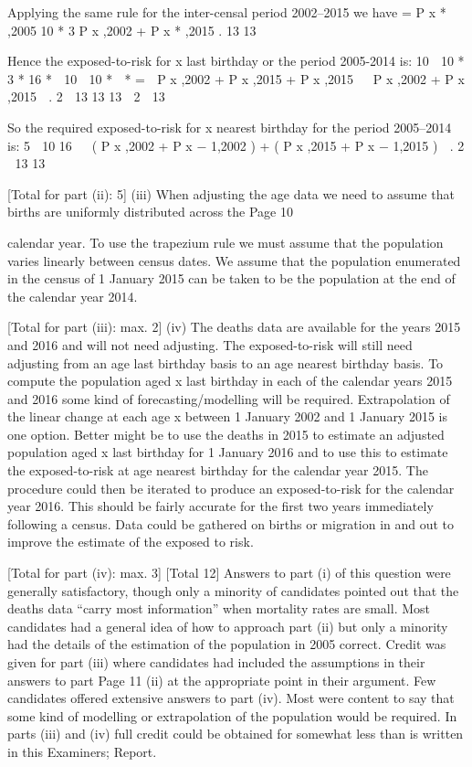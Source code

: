 \documentclass[a4paper,12pt]{article}
\begin{document}
Applying the same rule for the inter-censal period 2002–2015 we have
=
P x * ,2005
10 *
3
P x ,2002 + P x * ,2015 .
13
13

Hence the exposed-to-risk for x last birthday or the period 2005-2014 is:
10  10 *
3 *
16 *
 10  10 *

*
=
 P x ,2002 + P x ,2015 + P x ,2015

 P x ,2002 + P x ,2015  .
2  13
13
13
 2  13


So the required exposed-to-risk for x nearest birthday for the period
2005–2014 is:
5  10
16

 ( P x ,2002 + P x − 1,2002 ) + ( P x ,2015 + P x − 1,2015 )  .
2  13
13


[Total for part (ii): 5]
(iii)
When adjusting the age data
we need to assume that births are uniformly distributed across the
Page 10

calendar year. 
To use the trapezium rule 
we must assume that the population varies linearly between census
dates. 
We assume that the population enumerated in the census of 1 January
2015 can be taken to be the population at the end of the calendar year
2014.

[Total for part (iii): max. 2]
(iv)
The deaths data are available for the years 2015 and 2016 and will
not need adjusting. 
The exposed-to-risk will still need adjusting from an age last
birthday basis to an age nearest birthday basis. 
To compute the population aged x last birthday in each of the
calendar years 2015 and 2016 some kind of forecasting/modelling
will be required. 
Extrapolation of the linear change at each age x between
1 January 2002 and 1 January 2015 is one option. 
Better might be to use the deaths in 2015 to estimate an adjusted
population aged x last birthday for 1 January 2016 and to use this
to estimate the exposed-to-risk at age nearest birthday for the
calendar year 2015. 
The procedure could then be iterated to produce an exposed-to-risk
for the calendar year 2016. 
This should be fairly accurate for the first two years immediately
following a census. 
Data could be gathered on births or migration in and out to improve the
estimate of the exposed to risk.

[Total for part (iv): max. 3]
[Total 12]
Answers to part (i) of this question were generally satisfactory,
though only a minority of candidates pointed out that the deaths
data “carry most information” when mortality rates are small.
Most candidates had a general idea of how to approach part (ii)
but only a minority had the details of the estimation of the
population in 2005 correct. Credit was given for part (iii) where
candidates had included the assumptions in their answers to part
Page 11
(ii) at the appropriate point in their argument. Few candidates
offered extensive answers to part (iv). Most were content to say
that some kind of modelling or extrapolation of the population
would be required. In parts (iii) and (iv) full credit could be
obtained for somewhat less than is written in this Examiners;
Report.
\end{document}
